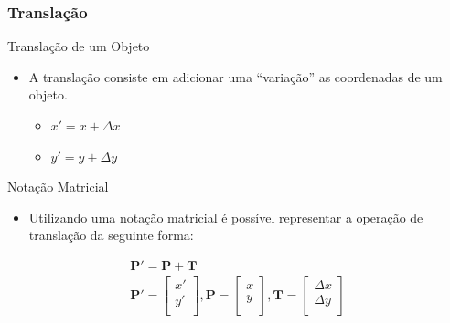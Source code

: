 \documentclass[fleqn]{beamer}
\begin{document}
\begin{frame}
\frametitle{Translação}


	\begin{block}{Translação de um Objeto}
		\begin{itemize}
			\item A translação consiste em adicionar uma ``variação'' as coordenadas de um objeto.
			\begin{itemize}
				\item $x' = x + \Delta x$
				\item $y' = y + \Delta y$
			\end{itemize}
		\end{itemize}
		
	\end{block}
	
	\begin{block}{Notação Matricial}
		\begin{itemize}
			\item Utilizando uma notação matricial é possível representar a operação de translação da seguinte forma:
		\end{itemize}
		\begin{eqnarray*}
			\textbf{P}' = \textbf{P} + \textbf{T} \\
			\textbf{P}' = 	\begin{bmatrix} 
								x' \\
								y' \\
							\end{bmatrix}
			,\textbf{P} = 	\begin{bmatrix}
								x \\
								y \\
							\end{bmatrix}
			,\textbf{T} = 	\begin{bmatrix}
								\Delta x \\
								\Delta y \\
							\end{bmatrix}
		\end{eqnarray*}
		
	\end{block}
	
\end{frame}

\end{document}
